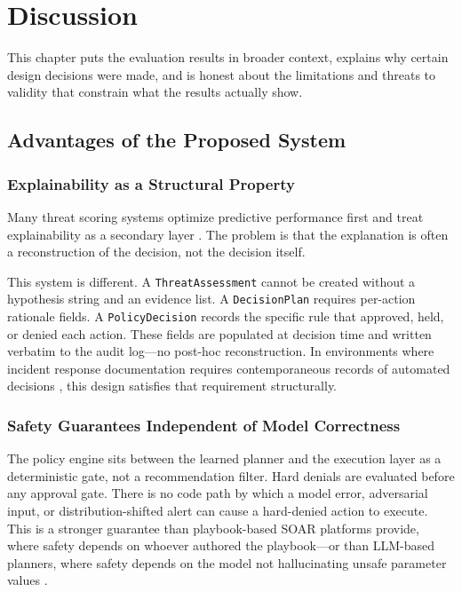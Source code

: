 \chapter{Discussion}
\label{chap:discussion}

This chapter puts the evaluation results in broader context, explains why certain design decisions were made, and is honest about the limitations and threats to validity that constrain what the results actually show.

\section{Advantages of the Proposed System}
\label{sec:discussion-advantages}

\subsection{Explainability as a Structural Property}

Many threat scoring systems optimize predictive performance first and treat explainability as a secondary layer \cite{sommer2010outside, tilbury2024humans}. The problem is that the explanation is often a reconstruction of the decision, not the decision itself.

This system is different. A \texttt{ThreatAssessment} cannot be created without a hypothesis string and an evidence list. A \texttt{DecisionPlan} requires per-action rationale fields. A \texttt{PolicyDecision} records the specific rule that approved, held, or denied each action. These fields are populated at decision time and written verbatim to the audit log---no post-hoc reconstruction. In environments where incident response documentation requires contemporaneous records of automated decisions \cite{nist80061}, this design satisfies that requirement structurally.

\subsection{Safety Guarantees Independent of Model Correctness}

The policy engine sits between the learned planner and the execution layer as a deterministic gate, not a recommendation filter. Hard denials are evaluated before any approval gate. There is no code path by which a model error, adversarial input, or distribution-shifted alert can cause a hard-denied action to execute. This is a stronger guarantee than playbook-based SOAR platforms provide, where safety depends on whoever authored the playbook---or than LLM-based planners, where safety depends on the model not hallucinating unsafe parameter values \cite{tilbury2024humans}.

